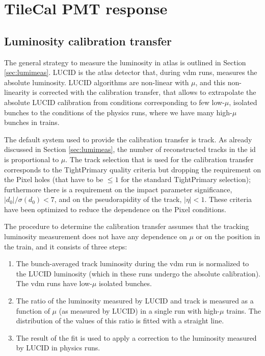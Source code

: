 \chapter{TileCal PMT response}
\label{app:pmt}

\section{Luminosity calibration transfer}

The general strategy to measure the luminosity in \gls{atlas} is outlined in Section \ref{sec:lumimeas}.
LUCID is the \gls{atlas} detector that, during \gls{vdm} runs, measures the absolute luminosity. 
LUCID algorithms are non-linear with $\mu$, and this non-linearity is corrected with the calibration transfer, 
that 
allows to extrapolate the absolute LUCID calibration from conditions corresponding to few low-$\mu$, isolated bunches 
to the conditions of the physics runs, where we have many high-$\mu$ bunches in trains. 

The default system used to provide the calibration transfer is track. As already discussed in Section \ref{sec:lumimeas},
the number of reconstructed tracks in the \gls{id} is proportional to $\mu$. 
The track selection that is used for the calibration transfer corresponds to the TightPrimary quality criteria but dropping 
the requirement on the Pixel holes (that have to be $\leq 1$ for the standard TightPrimary selection);
furthermore there is a requirement on the impact parameter significance, $|d_0|/\sigma(d_0)<7$, and on 
the pseudorapidity of the track, $|\eta|<1$. These criteria have been optimized to reduce the dependence on the Pixel conditions. 

The procedure to determine the calibration transfer assumes that the tracking luminosity measurement 
does not have any dependence on $\mu$ or on the position in the train, and it consists of three steps:
\begin{enumerate}
\item The bunch-averaged track luminosity during the \gls{vdm} run is normalized to the LUCID luminosity (which in these runs 
undergo the absolute calibration). The \gls{vdm} runs have low-$\mu$ isolated bunches.
\item The ratio of the luminosity measured by LUCID and track is measured as a function of $\mu$ (as measured by LUCID) 
in a single run with high-$\mu$ trains. The distribution of the values of this ratio is fitted with a straight line.
\item The result of the fit is used to apply a correction to the luminosity measured by LUCID in physics runs. 
\end{enumerate}

